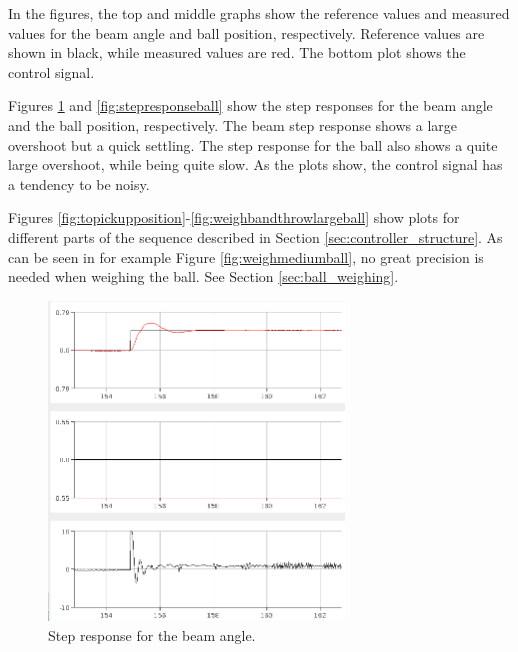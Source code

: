 
In the figures, the top and middle graphs show the reference values and measured values for the beam angle and ball position, respectively.
Reference values are shown in black, while measured values are red.
The bottom plot shows the control signal.

Figures \ref{fig:stepresponsebeam} and \ref{fig:stepresponseball} show the step responses for the beam angle and the ball position, respectively. 
The beam step response shows a large overshoot but a quick settling.
The step response for the ball also shows a quite large overshoot, while being quite slow.
As the plots show, the control signal has a tendency to be noisy.

Figures \ref{fig:topickupposition}-\ref{fig:weighbandthrowlargeball} show plots for different parts of the sequence described in Section \ref{sec:controller_structure}.
As can be seen in for example Figure \ref{fig:weighmediumball}, no great precision is needed when weighing the ball. See Section \ref{sec:ball_weighing}.

\begin{figure}[h]
\centering
\includegraphics[width=0.7\textwidth]{figures/stepresponsebeam-crop.png}
\caption{Step response for the beam angle.}
\label{fig:stepresponsebeam}
\end{figure}

